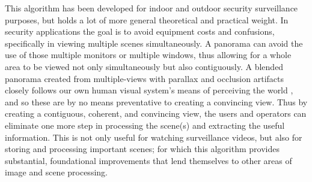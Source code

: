 %
%
%
%
%
%
%
%
%

%
%
%



This algorithm has been developed for indoor and outdoor security surveillance purposes, but holds a lot of more general theoretical and practical weight. In security applications the goal is to avoid equipment costs and confusions, specifically in viewing multiple scenes simultaneously. A panorama can avoid the use of those multiple monitors or multiple windows, thus allowing for a whole area to be viewed not only simultaneously but also contiguously. A blended panorama created from multiple-views with parallax and occlusion artifacts closely follows our own human visual system's means of perceiving the world \cite{Palmer1999}, and so these are by no means preventative to creating a convincing view. Thus by creating a contiguous, coherent, and convincing view, the users and operators can eliminate one more step in processing the scene(s) and extracting the useful information. This is not only useful for watching surveillance videos, but also for storing and processing important scenes; for which this algorithm provides substantial, foundational improvements that lend themselves to other areas of image and scene processing.

